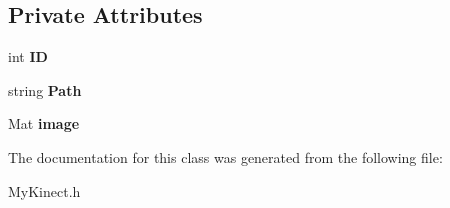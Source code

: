 \subsection*{Private Attributes}
\begin{DoxyCompactItemize}
\item 
\mbox{\label{class_kinect_1_1_picture_ac14a5c5d6b0801e5a1a1614e6ad3ab68}} 
int {\bfseries ID}
\item 
\mbox{\label{class_kinect_1_1_picture_a1cd11e6e5599a0bf759e0b862b142243}} 
string {\bfseries Path}
\item 
\mbox{\label{class_kinect_1_1_picture_a6d7aa2311c6d80e08bbf6e4a12777381}} 
Mat {\bfseries image}
\end{DoxyCompactItemize}


The documentation for this class was generated from the following file\+:\begin{DoxyCompactItemize}
\item 
My\+Kinect.\+h\end{DoxyCompactItemize}

